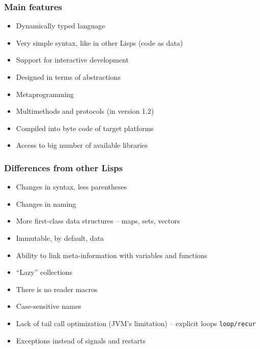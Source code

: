 \begin{frame}[t]
  \frametitle{Main features}
  \begin{itemize}
  \item Dynamically typed language
  \item Very simple syntax, like in other Lisps (code as data)
  \item Support for interactive development
  \item Designed in terms of abstractions
  \item Metaprogramming
  \item Multimethods and protocols (in version 1.2)
  \item Compiled into byte code of target platforms
  \item Access to big number of available libraries
  \end{itemize}
\end{frame}


\begin{frame}[t]
  \frametitle{Differences from other Lisps}
  \begin{itemize}
  \item Changes in syntax, less parentheses
  \item Changes in naming
  \item More first-class data structures -- maps, sets, vectors
  \item Immutable, by default, data
  \item Ability to link meta-information with variables and functions
  \item ``Lazy'' collections
  \item There is no reader macros
  \item Case-sensitive names
  \item Lack of tail call optimization (JVM's limitation) -- explicit loops \texttt{loop/recur}
  \item Exceptions instead of signals and restarts
  \end{itemize}
\end{frame}


